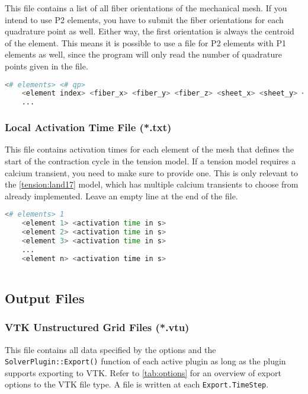 This file contains a list of all fiber orientations of the mechanical mesh. 
If you intend to use P2 elements, you have to submit the fiber orientations for each quadrature point as well.
Either way, the first orientation is always the centroid of the element.
This means it is possible to use a file for P2 elements with P1 elements as well, since the program will only read the number of quadrature points given in the file.
\begin{lstlisting}[language=Bash,caption=Fiber Orientation File (*.bases)]
    <# elements> <# qp>
    <element index> <fiber_x> <fiber_y> <fiber_z> <sheet_x> <sheet_y> <sheet_z> <normal_x> <normal_y> <normal_z>
    ...
\end{lstlisting}

\subsubsection{Local Activation Time File (*.txt)}
\label{LATFile}

This file contains activation times for each element of the mesh that defines the start of the contraction cycle in the tension model.
If a tension model requires a calcium transient, you need to make sure to provide one.
This is only relevant to the \autoref{tension:land17} model, which has multiple calcium transients to choose from already implemented.
Leave an empty line at the end of the file.
\begin{lstlisting}[language=Bash,caption=Local Activation Time File (*.txt)]
    <# elements> 1
    <element 1> <activation time in s>
    <element 2> <activation time in s>
    <element 3> <activation time in s>
    ...
    <element n> <activation time in s>
    
\end{lstlisting}

\subsection{Output Files}
\label{sec:outfiles}

\subsubsection{VTK Unstructured Grid Files (*.vtu)}
\label{subsubsec:VTK}

This file contains all data specified by the  options and the \verb|SolverPlugin::Export()| function of each active plugin as long as the plugin supports exporting to VTK.
Refer to \autoref{tab:options} for an overview of export options to the VTK file type.
A file is written at each \verb|Export.TimeStep|.

